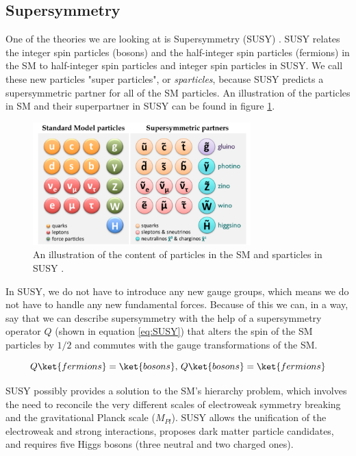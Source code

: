 \subsection{Supersymmetry}
\label{sec:SUSY}
One of the theories we are looking at is Supersymmetry (SUSY) \cite{sleptonexclusion}. SUSY relates the integer spin particles (bosons) and the half-integer spin particles (fermions) in the SM to half-integer spin particles and integer spin particles in SUSY. We call these new particles "super particles", or \textit{sparticles}, because SUSY predicts a supersymmetric partner for all of the SM particles. An illustration of the particles in SM and their superpartner in SUSY can be found in figure \ref{fig:smandsusy}.

\begin{figure}[H]
    \centering
    \includegraphics[width = 0.75\textwidth]{Figures/FromOnline/susy_particles.png}
    \caption{An illustration of the content of particles in the SM and sparticles in SUSY \cite{SUSYpic}.}
    \label{fig:smandsusy}
\end{figure}

In SUSY, we do not have to introduce any new gauge groups, which means we do not have to handle any new fundamental forces. Because of this we can, in a way, say that we can describe supersymmetry with the help of a supersymmetry operator $Q$ (shown in equation \ref{eq:SUSY}) that alters the spin of the SM particles by $1/2$ and commutes with the gauge transformations of the SM. 

\begin{equation}
    \label{eq:SUSY}
    Q\ket{fermions} = \ket{bosons} \text{,   }  Q\ket{bosons} =\ket{fermions}
\end{equation}

SUSY possibly provides a solution to the SM's hierarchy problem, which involves the need to reconcile the very different scales of electroweak symmetry breaking and the gravitational Planck scale ($M_{Pl}$). SUSY allows the unification of the electroweak and strong interactions, proposes dark matter particle candidates, and requires five Higgs bosons (three neutral and two charged ones). 




